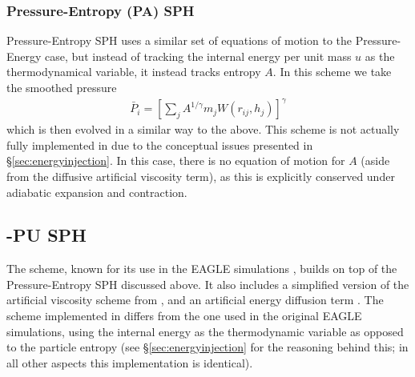 \subsubsection{Pressure-Entropy (PA) SPH}

Pressure-Entropy SPH uses a similar set of equations of motion to the
Pressure-Energy case, but instead of tracking the internal energy per unit
mass $u$ as the thermodynamical variable, it instead tracks entropy $A$.
In this scheme we take the smoothed pressure
\begin{align}
    \bar{P}_i = \left[ 
        \sum_j A^{1 / \gamma} m_j W(r_{ij}, h_j)
    \right]^\gamma
\end{align}
which is then evolved in a similar way to the above. This scheme is not
actually fully implemented in \swift{} due to the conceptual issues presented
in \S \ref{sec:energyinjection}. In this case, there is no equation of motion
for $A$ (aside from the diffusive artificial viscosity term), as this is
explicitly conserved under adiabatic expansion and contraction.

\subsection{\anarchy{}-PU SPH}

The \anarchy{} scheme, known for its use in the EAGLE simulations
\citep{Schaye2015, Crain2015, Schaller2015}, builds on top of the
Pressure-Entropy SPH discussed above. It also includes a simplified version
of the artificial viscosity scheme from \citet{Cullen2010}, and an artificial
energy diffusion term \citep{Price2008}. The scheme implemented in \swift{}
differs from the one used in the original EAGLE simulations, using the
internal energy as the thermodynamic variable as opposed to the particle
entropy (see \S \ref{sec:energyinjection} for the reasoning behind this; in
all other aspects this implementation is identical).

